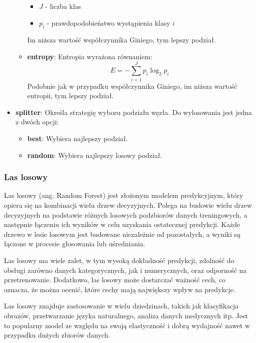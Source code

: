 \documentclass{article}
\begin{document}
\begin{itemize}
\begin{itemize}
\begin{itemize}
            \item $J$ - liczba klas
            \item $p_i$ - prawdopodobieństwo wystąpienia klasy $i$
        \end{itemize}
        Im niższa wartość współczynnika Giniego, tym lepszy podział.
        \item \textbf{entropy}: Entropia wyrażona równaniem:
        \begin{equation}
            E = -\sum_{i=1}^{J}p_i\log_2{p_i}
        \end{equation}
        Podobnie jak w przypadku współczynnika Giniego, im niższa
        wartość entropii, tym lepszy podział.
    \end{itemize}
    \item \textbf{splitter}: Określa strategię 
    wyboru podziału węzła. Do wylosowania jest
    jedna z dwóch opcji:
    \begin{itemize}
        \item \textbf{best}: Wybiera najlepszy podział.
        \item \textbf{random}: Wybiera najlepszy losowy podział.
    \end{itemize}

\end{itemize}

\subsubsection{Las losowy}
Las losowy (ang. Random Forest) jest złożonym modelem 
predykcyjnym, który opiera się na kombinacji wielu drzew decyzyjnych. 
Polega na budowie wielu drzew decyzyjnych na podstawie 
różnych losowych podzbiorów danych treningowych, a 
następnie łączeniu ich wyników w celu uzyskania ostatecznej 
predykcji. Każde drzewo w lesie losowym jest budowane 
niezależnie od pozostałych, a wyniki są łączone w procesie 
głosowania lub uśredniania.

Las losowy ma wiele zalet, w tym wysoką dokładność 
predykcji, zdolność do obsługi zarówno danych 
kategorycznych, jak i numerycznych, oraz odporność 
na przetrenowanie. Dodatkowo, las losowy może dostarczać 
ważność cech, co oznacza, że można ocenić, które cechy 
mają największy wpływ na predykcje.

Las losowy znajduje zastosowanie w wielu dziedzinach, 
takich jak klasyfikacja obrazów, przetwarzanie 
języka naturalnego, analiza danych medycznych itp. 
Jest to popularny model ze względu na swoją elastyczność 
i dobrą wydajność nawet w przypadku dużych zbiorów danych.
\end{document}
